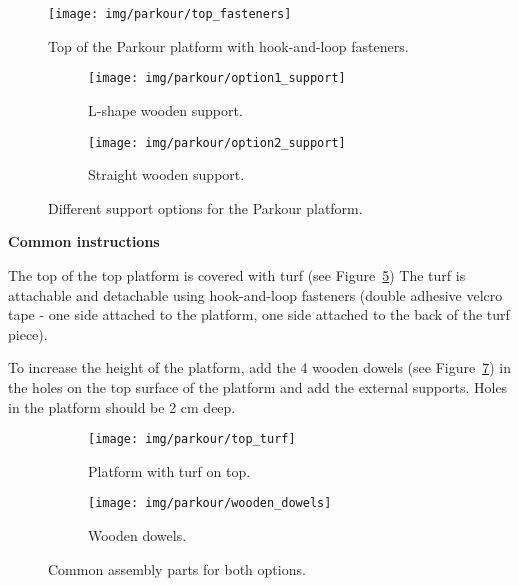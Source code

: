 \begin{figure}[htb]
  \centering
  \texttt{[image: img/parkour/top\_fasteners]}
  \caption{Top of the Parkour platform with hook-and-loop fasteners.}
  \label{fig:parkour-top-platform-with-hook-and-loop}
\end{figure}

\begin{figure}[htb]
  \begin{subfigure}{.45\textwidth}
    \centering
    \texttt{[image: img/parkour/option1\_support]}
    \caption{L-shape wooden support.}
    \label{fig:parkour-option1-support}
  \end{subfigure}
  \hfill
  \begin{subfigure}{.45\textwidth}
    \centering
    \texttt{[image: img/parkour/option2\_support]}
    \caption{Straight wooden support.}
    \label{fig:parkour-option2-support}
  \end{subfigure}
  \caption{Different support options for the Parkour platform.}
\end{figure}

\bigskip

{\bfseries Common instructions}

\headlinebox

The top of the top platform is covered with turf
(see Figure~\ref{fig:parkour-top-turf})
The turf is attachable and detachable using hook-and-loop fasteners
(double adhesive velcro tape - one side attached to the platform,
one side attached to the back of the turf piece). 

To increase the height of the platform,
add the 4 wooden dowels (see Figure~\ref{fig:parkour-wooden-dowels})
in the holes on the top surface of the platform and add the external supports.
Holes in the platform should be 2 cm deep.

\begin{figure}[htb]
  \begin{subfigure}{.45\textwidth}
    \centering
    \texttt{[image: img/parkour/top\_turf]}
    \caption{Platform with turf on top.}
    \label{fig:parkour-top-turf}
  \end{subfigure}
  \hfill
  \begin{subfigure}{.45\textwidth}
    \centering
    \texttt{[image: img/parkour/wooden\_dowels]}
    \caption{Wooden dowels.}
    \label{fig:parkour-wooden-dowels}
  \end{subfigure}
  \caption{Common assembly parts for both options.}
\end{figure}

